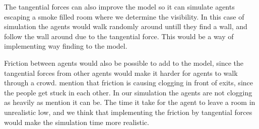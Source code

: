 The tangential forces can also improve the model so it can simulate agents escaping a smoke filled room where we determine the visibility.
In this case of simulation the agents would walk randomly around untill they find a wall, and follow the wall around due to the tangential force.
This would be a way of implementing way finding to the model.

Friction between agents would also be possible to add to the model, since the tangential forces from other agents would make it
harder for agents to walk through a crowd. \cite{self-org} mention that friction is causing clogging in front of exits, since the people
get stuck in each other. In our simulation the agents are not clogging as heavily as \cite{self-org} mention it can be.
The time it take for the agent to leave a room in unrealistic low, and we think that implementing the friction by tangential forces
would make the simulation time more realistic.
